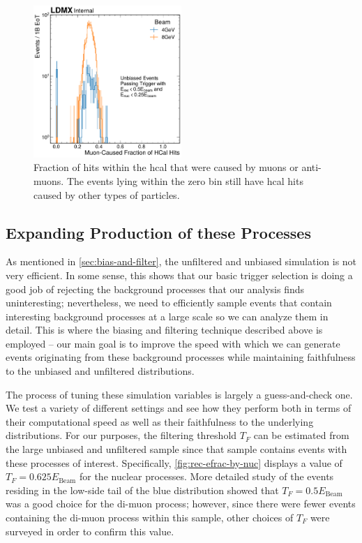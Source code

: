 \begin{figure}
  \centering
  \includegraphics[width=0.5\textwidth]{figures/ldmx/simulation/dimuon-confirmation-hcal-hit-fraction.pdf}
  \caption{Fraction of hits within the \ac{hcal} that were caused by muons or anti-muons.
  The events lying within the zero bin still have \ac{hcal} hits caused by other types of particles.}
  \label{fig:dimuon-confirm}
\end{figure}

\subsection{Expanding Production of these Processes}
As mentioned in \cref{sec:bias-and-filter}, the unfiltered and unbiased simulation is
not very efficient.
In some sense, this shows that our basic trigger selection is doing a good job of
rejecting the background processes that our analysis finds uninteresting;
nevertheless, we need to efficiently sample events that contain interesting background processes
at a large scale so we can analyze them in detail.
This is where the biasing and filtering technique described above is employed --
our main goal is to improve the speed with which we can generate events originating from
these background processes while maintaining faithfulness to the unbiased and unfiltered distributions.

The process of tuning these simulation variables is largely a guess-and-check one.
We test a variety of different settings and see how they perform both in terms of
their computational speed as well as their faithfulness to the underlying distributions.
For our purposes, the filtering threshold $T_F$ can be estimated from the large unbiased
and unfiltered sample since that sample contains events with these processes of interest.
Specifically, \cref{fig:rec-efrac-by-nuc} displays a value of $T_F = 0.625E_\text{Beam}$ for
the nuclear processes.
More detailed study of the events residing in the low-side tail of the blue distribution
showed that $T_F = 0.5E_\text{Beam}$ was a good choice for the di-muon process; however,
since there were fewer events containing the di-muon process within this sample,
other choices of $T_F$ were surveyed in order to confirm this value.

